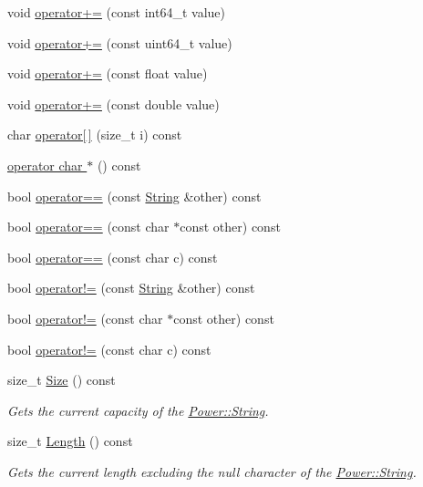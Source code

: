 \begin{DoxyCompactItemize}
void \hyperlink{class_power_1_1_string_a4de514d070a1c7bf464e97f35868e37c}{operator+=} (const int64\+\_\+t value)
\item 
void \hyperlink{class_power_1_1_string_a9ccf03d5cef8d756d82c7b198e65392d}{operator+=} (const uint64\+\_\+t value)
\item 
void \hyperlink{class_power_1_1_string_a9ac2eb1de5bf6a9232e85abbcb4c9bf2}{operator+=} (const float value)
\item 
void \hyperlink{class_power_1_1_string_a8689efc9a824d938249a78f02918e57d}{operator+=} (const double value)
\item 
char \hyperlink{class_power_1_1_string_a9205107e5478a19d5f54cf0db0677be4}{operator\mbox{[}$\,$\mbox{]}} (size\+\_\+t i) const
\item 
\hyperlink{class_power_1_1_string_aac2b54b25a77ac3669b5ef87d5f74da7}{operator char $\ast$} () const
\item 
bool \hyperlink{class_power_1_1_string_ae4616e12ee74fcb4f86ffaa15560854b}{operator==} (const \hyperlink{class_power_1_1_string}{String} \&other) const
\item 
bool \hyperlink{class_power_1_1_string_ae357277377a5d612450fcf852ba5bee9}{operator==} (const char $\ast$const other) const
\item 
bool \hyperlink{class_power_1_1_string_a9a5cf72ccd272199f2eeb4baeaf7789f}{operator==} (const char c) const
\item 
bool \hyperlink{class_power_1_1_string_a554a6ff1a319237b53d978ed3ef18f07}{operator!=} (const \hyperlink{class_power_1_1_string}{String} \&other) const
\item 
bool \hyperlink{class_power_1_1_string_a267b8f261bcafb9ec6d86cfe12494c94}{operator!=} (const char $\ast$const other) const
\item 
bool \hyperlink{class_power_1_1_string_a3216ffa5d292b08997d1c93d3c33251e}{operator!=} (const char c) const
\item 
size\+\_\+t \hyperlink{class_power_1_1_string_aa62245fcf9bd8261b4b13c558dc45daf}{Size} () const
\begin{DoxyCompactList}\small\item\em Gets the current capacity of the \hyperlink{class_power_1_1_string}{Power\+::\+String}. \end{DoxyCompactList}\item 
size\+\_\+t \hyperlink{class_power_1_1_string_a04a9b77cf53b0421d4da863ec1d62707}{Length} () const
\begin{DoxyCompactList}\small\item\em Gets the current length excluding the null character of the \hyperlink{class_power_1_1_string}{Power\+::\+String}. \end{DoxyCompactList}\item 

\end{DoxyCompactItemize}
